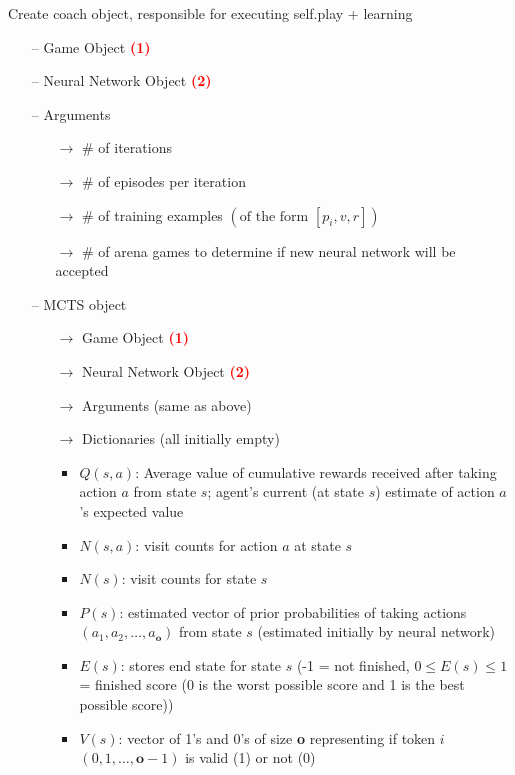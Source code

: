 \documentclass[12pt]{article}
\begin{document}
\begin{redenum}
\item Create coach object, responsible for executing self.play + learning
	\begin{itemize}
	\item[--] Game Object \textcolor{red}{\textbf{(1)}}
	\item[--] Neural Network Object \textcolor{red}{\textbf{(2)}}
	\item[--] Arguments
		\begin{itemize}
			\item[$\rightarrow$] \# of iterations
			\item[$\rightarrow$] \# of episodes per iteration
			\item[$\rightarrow$] \# of training examples $\left(\text{of the form } \left[p_i, v, r\right]\right)$
			\item[$\rightarrow$] \# of arena games to determine if new neural network will be accepted
		\end{itemize}
	\item[--] MCTS object
		\begin{itemize}
			\item[$\rightarrow$] Game Object \textcolor{red}{\textbf{(1)}}
			\item[$\rightarrow$] Neural Network Object \textcolor{red}{\textbf{(2)}}
			\item[$\rightarrow$] Arguments (same as above)
			\item[$\rightarrow$]  Dictionaries (all initially empty)
			\begin{itemize}
				\item $Q(s,a)$: Average value of cumulative rewards received after taking action $a$ from state $s$; agent's current (at state $s$) estimate of action $a$'s expected value
				\item $N(s,a)$: visit counts for action $a$ at state $s$
				\item $N(s)$: visit counts for state $s$
				\item $P(s)$: estimated vector of prior probabilities of taking actions $\left(a_1, a_2, \ldots, a_{\textbf{o}} \right)$ from state $s$ (estimated initially by neural network)
				\item $E(s)$: stores end state for state $s$ (-1 = not finished, $0 \leq E(s) \leq 1$ = finished score (0 is the worst possible score and 1 is the best possible score))
				\item $V(s)$: vector of 1's and 0's of size \textbf{o} representing if token $i$ $(0, 1, \ldots,\textbf{o}-1)$ is valid (1) or not (0)
			

\end{itemize}
\end{itemize}
\end{itemize}
\end{redenum}
\end{document}
